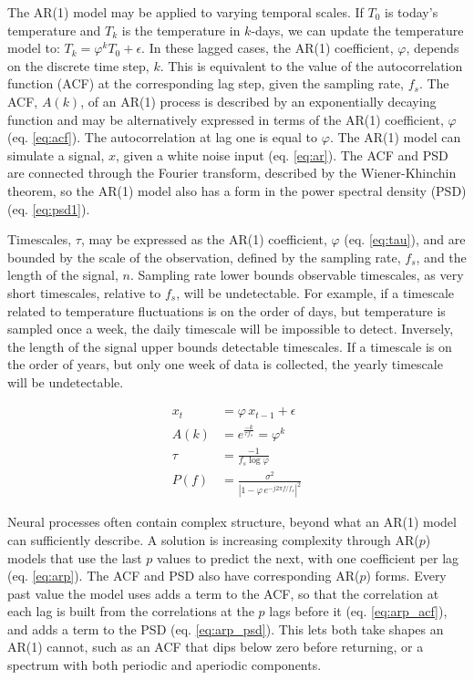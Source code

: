 \documentclass[pdflatex,sn-mathphys-num]{sn-jnl}
\begin{document}
The AR(1) model may be applied to varying temporal scales. If $T_0$ is today's temperature and $T_k$ is the temperature in $k$-days, we can update the temperature model to: $T_k = \varphi^k T_0 + \epsilon$. In these lagged cases, the AR(1) coefficient, $\varphi$, depends on the discrete time step, $k$. This is equivalent to the value of the autocorrelation function (ACF) at the corresponding lag step, given the sampling rate, $f_s$. The ACF, $A(k)$, of an AR(1) process is described by an exponentially decaying function and may be alternatively expressed in terms of the AR(1) coefficient, $\varphi$ (eq. \ref{eq:acf}). The autocorrelation at lag one is equal to $\varphi$. The AR(1) model can simulate a signal, $x$, given a white noise input (eq. \ref{eq:ar}). The ACF and PSD are connected through the Fourier transform, described by the Wiener-Khinchin theorem, so the AR(1) model also has a form in the power spectral density (PSD) (eq. \ref{eq:psd1}).

Timescales, $\tau$, may be expressed as the AR(1) coefficient, $\varphi$ (eq. \ref{eq:tau}), and are bounded by the scale of the observation, defined by the sampling rate, $f_s$, and the length of the signal, $n$. Sampling rate lower bounds observable timescales, as very short timescales, relative to $f_s$, will be undetectable. For example, if a timescale related to temperature fluctuations is on the order of days, but temperature is sampled once a week, the daily timescale will be impossible to detect. Inversely, the length of the signal upper bounds detectable timescales. If a timescale is on the order of years, but only one week of data is collected, the yearly timescale will be undetectable.

\begin{align}
x_t &= \varphi\, x_{t-1} + \epsilon \label{eq:ar} \\
A(k) &= e^{\frac{-k}{\tau f_s}} = \varphi^k \label{eq:acf} \\
\tau &= \frac{-1}{f_s \log{\varphi}} \label{eq:tau} \\
P(f) &= \frac{\sigma^{2}}{\left|1 - \varphi\, e^{-j 2 \pi f / f_s}\right|^{2}} \label{eq:psd1}
\end{align}

Neural processes often contain complex structure, beyond what an AR(1) model can sufficiently describe. A solution is increasing complexity through AR($p$) models that use the last $p$ values to predict the next, with one coefficient per lag (eq. \ref{eq:arp}). The ACF and PSD also have corresponding AR($p$) forms. Every past value the model uses adds a term to the ACF, so that the correlation at each lag is built from the correlations at the $p$ lags before it (eq. \ref{eq:arp_acf}), and adds a term to the PSD (eq. \ref{eq:arp_psd}). This lets both take shapes an AR(1) cannot, such as an ACF that dips below zero before returning, or a spectrum with both periodic and aperiodic components.
\end{document}
